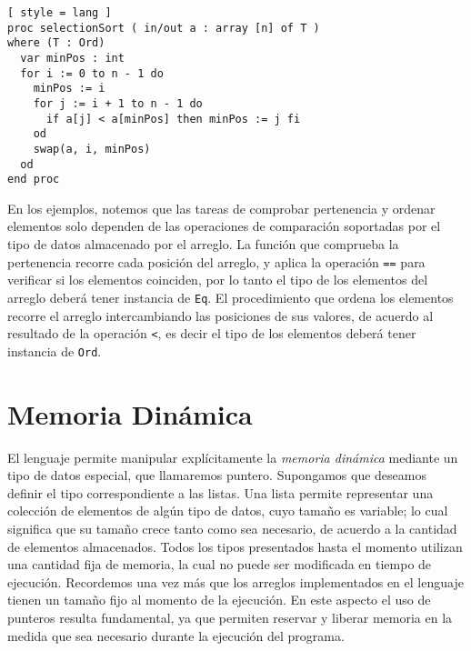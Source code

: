 \begin{lstlisting}[ style = lang ]
proc selectionSort ( in/out a : array [n] of T )
where (T : Ord)
  var minPos : int
  for i := 0 to n - 1 do
    minPos := i
    for j := i + 1 to n - 1 do
      if a[j] < a[minPos] then minPos := j fi
    od
    swap(a, i, minPos)
  od
end proc
\end{lstlisting}

En los ejemplos, notemos que las tareas de comprobar pertenencia y ordenar elementos solo dependen de las operaciones de comparación soportadas por el tipo de datos almacenado por el arreglo.
La función que comprueba la pertenencia recorre cada posición del arreglo, y aplica la operación \lstinline[style = lang]{==} para verificar si los elementos coinciden, por lo tanto el tipo de los elementos del arreglo deberá tener instancia de \lstinline[style = lang]{Eq}.
El procedimiento que ordena los elementos recorre el arreglo intercambiando las posiciones de sus valores, de acuerdo al resultado de la operación \lstinline[style = lang]{<}, es decir el tipo de los elementos deberá tener instancia de \lstinline[style = lang]{Ord}.



\section{Memoria Dinámica}

El lenguaje permite manipular explícitamente la \textit{memoria dinámica} mediante un tipo de datos especial, que llamaremos puntero.
Supongamos que deseamos definir el tipo correspondiente a las listas.
Una lista permite representar una colección de elementos de algún tipo de datos, cuyo tamaño es variable; lo cual significa que su tamaño crece tanto como sea necesario, de acuerdo a la cantidad de elementos almacenados.
Todos los tipos presentados hasta el momento utilizan una cantidad fija de memoria, la cual no puede ser modificada en tiempo de ejecución.
Recordemos una vez más que los arreglos implementados en el lenguaje tienen un tamaño fijo al momento de la ejecución.
En este aspecto el uso de punteros resulta fundamental, ya que permiten reservar y liberar memoria en la medida que sea necesario durante la ejecución del programa.

